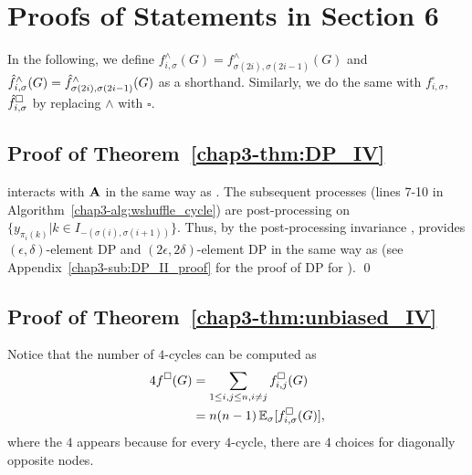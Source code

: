 
\section{Proofs of Statements in Section 6}
\label{chap3-sec:4cycle_proof}
In the following, we define
$f_{i,\sigma}^\wedge(G) = f^\wedge_{\sigma(2i), \sigma(2i-1)}(G)$ and
$\hat{f}_{i,\sigma}^\wedge(G) = \hat{f}^\wedge_{\sigma(2i), \sigma(2i-1)}(G)$ as a shorthand.
Similarly, we do the same with $f_{i,\sigma}^\square$, $\hat{f}_{i,\sigma}^\square$
by replacing $\wedge$ with $\square$.

\subsection{Proof of Theorem~\ref{chap3-thm:DP_IV}}
\label{chap3-sub:DP_IV_proof}
\AlgWSCyc{} interacts with $\mathbf{A}$ in the same way as \AlgWSTri{}. 
The subsequent processes (lines 7-10 in Algorithm~\ref{chap3-alg:wshuffle_cycle}) are post-processing on $\{y_{\pi_i(k)} | k \in I_{-(\sigma(i),\sigma(i+1))}\}$. 
Thus, by the post-processing invariance \cite{DP}, \AlgWSCyc{} provides
$(\epsilon, \delta)$-element DP and $(2\epsilon, 2\delta)$-element DP in the same way as \AlgWSTri{} (see Appendix~\ref{chap3-sub:DP_II_proof} for the proof of DP for \AlgWSTri{}). \qed

\subsection{Proof of Theorem~\ref{chap3-thm:unbiased_IV}}
\label{chap3-sub:unbiased_IV_proof}
  Notice that the number of $4$-cycles can be computed as
  \begin{align}
    4f^\square(G) &= \sum_{1 \leq i,j \leq n, i \neq j} f_{i,j}^\square(G) \\
    &= n(n-1)\operatorname{\mathbb{E}}_{\sigma}[f_{i,\sigma}^\square(G)],\label{chap3-eq:4-cycle-calc}
  \end{align}
  where the $4$ appears because for every $4$-cycle, there are $4$ choices for
  diagonally opposite nodes.

